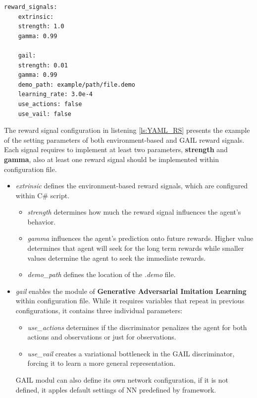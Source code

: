 \begin{lstlisting}[caption={Reward signals.}, label={ls:YAML_RS}]
	reward_signals:
	extrinsic:
	strength: 1.0
	gamma: 0.99
	
	gail:
	strength: 0.01
	gamma: 0.99
	demo_path: example/path/file.demo
	learning_rate: 3.0e-4
	use_actions: false
	use_vail: false
\end{lstlisting}
The reward signal configuration in listening \ref{ls:YAML_RS} presents the example of the setting parameters of both environment-based and GAIL reward signals. Each signal requires to implement at least two parameters, \textbf{strength} and \textbf{gamma}, also at least one reward signal should be implemented within configuration file.
\begin{itemize}
	\item \textit{extrinsic} defines the environment-based reward signals, which are configured within C\# script.
	\begin{itemize}
		\item \textit{strength} determines how much the reward signal influences the agent's behavior.
		\item \textit{gamma} influences the agent's prediction onto future rewards. Higher value determines that agent will seek for the long term rewards while smaller values determine the agent to seek the immediate rewards. 
		\item \textit{demo\_path} defines the location of the \textit{.demo} file.
	\end{itemize}
	
	\item \textit{gail} enables the module of \textbf{Generative Adversarial Imitation Learning} within configuration file. While it requires variables that repeat in previous configurations, it contains three individual parameters:
	\begin{itemize}
		\item \textit{use\_actions} determines if the discriminator penalizes the agent for both actions and observations or just for observations.
		\item \textit{use\_vail} creates a variational bottleneck in the GAIL discriminator, forcing it to learn a more general representation.
	\end{itemize}
	GAIL modul can also define its own network configuration, if it is not defined, it apples default settings of NN predefined by framework.
\end{itemize}

